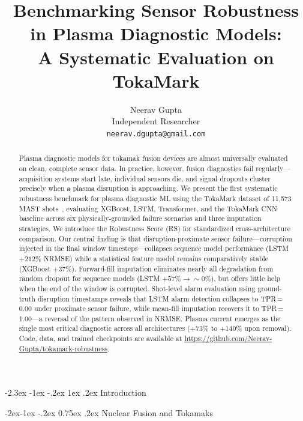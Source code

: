 \documentclass[10pt,twocolumn]{article}
\title{
    \Large\textbf{Benchmarking Sensor Robustness in Plasma Diagnostic Models:}\\
    \Large\textbf{A Systematic Evaluation on TokaMark}
}
\author{
    Neerav Gupta \\
    \small Independent Researcher \\
    \small \texttt{neerav.dgupta@gmail.com}
}
\date{}
\makeatletter
\renewcommand\section{\@startsection{section}{1}{\z@}%
  {-2.3ex \@plus -1ex \@minus -.2ex}%
  {1ex \@plus .2ex}%
  {\normalfont\Large\bfseries}}
\renewcommand\subsection{\@startsection{subsection}{2}{\z@}%
  {-2ex\@plus -1ex \@minus -.2ex}%
  {0.75ex \@plus .2ex}%
  {\normalfont\large\bfseries}}
\makeatother
\begin{document}
\maketitle

\begin{abstract}
Plasma diagnostic models for tokamak fusion devices are almost universally
evaluated on clean, complete sensor data. In practice, however, fusion
diagnostics fail regularly—acquisition systems start late, individual
sensors die, and signal dropouts cluster precisely when a plasma disruption
is approaching. We present the first systematic robustness benchmark for
plasma diagnostic ML using the TokaMark dataset of 11,573 MAST
shots~\cite{rousseau2026tokamark}, evaluating XGBoost, LSTM, Transformer,
and the TokaMark CNN baseline across six physically-grounded failure scenarios
and three imputation strategies. We introduce the Robustness Score (RS) for
standardized cross-architecture comparison. Our central finding is that
disruption-proximate sensor failure—corruption injected in the final window
timesteps—collapses sequence model performance (LSTM $+212\%$ NRMSE) while
a statistical feature model remains comparatively stable (XGBoost $+37\%$).
Forward-fill imputation eliminates nearly all degradation from random dropout
for sequence models (LSTM $+57\% \to {\sim}0\%$), but offers little help
when the end of the window is corrupted. Shot-level alarm evaluation using
ground-truth disruption timestamps reveals that LSTM alarm detection
collapses to TPR\,=\,0.00 under proximate sensor failure, while mean-fill
imputation recovers it to TPR\,=\,1.00—a reversal of the pattern observed
in NRMSE. Plasma current emerges as the single most critical diagnostic
across all architectures ($+73\%$ to $+140\%$ upon removal). Code, data,
and trained checkpoints are available at
\url{https://github.com/Neerav-Gupta/tokamark-robustness}.
\end{abstract}

\section{Introduction}

\subsection{Nuclear Fusion and Tokamaks}
\end{document}
